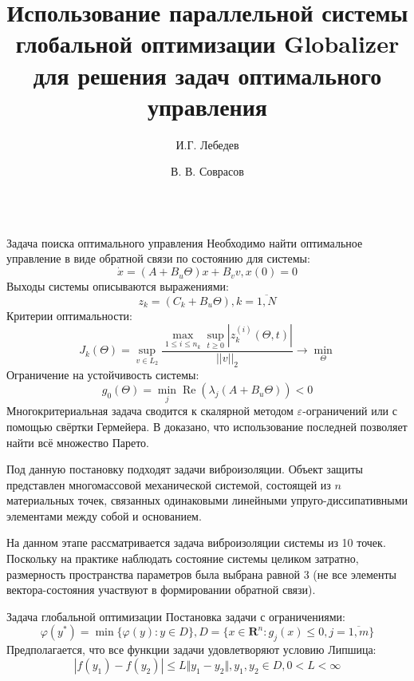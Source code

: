 \documentclass{beamer}
\title{Использование параллельной системы глобальной оптимизации Globalizer для
решения задач оптимального управления}
\author{И.Г. Лебедев \and В. В. Соврасов}
\institute{ННГУ им. Н.И. Лобачевского}
\DeclareMathOperator{\re}{\operatorname{Re}}
\begin{document}
\begin{frame}[t]
    \begin{columns}[t]
        \begin{column}[t]{0.48\paperwidth}
            \begin{block}{Задача поиска оптимального управления}
              Необходимо найти оптимальное управление в виде обратной связи по состоянию для системы:
              \begin{displaymath}
                \dot x = (A+B_u\Theta)x + B_v v, x(0)=0
              \end{displaymath}
              Выходы системы описываются выражениями:
              \begin{displaymath}
                z_k=(C_k+B_u\Theta),k=\overline{1,N}
              \end{displaymath}
              Критерии оптимальности:
              \begin{displaymath}
                J_k(\Theta)=\sup_{v\in L_2} \frac{\max_{1\leqslant i \leqslant n_k} \sup_{t\geqslant 0}|z_k^{(i)}(\Theta,t)|}{||v||_2} \rightarrow\min_{\Theta}
              \end{displaymath}
            Ограничение на устойчивость системы:
            \begin{displaymath}
              g_0(\Theta)=\min_{j}\re(\lambda_j(A+B_u\Theta)) < 0
            \end{displaymath}
            Многокритериальная задача сводится к скалярной методом \(\varepsilon\)-ограничений или с помощью свёртки Гермейера.
            В \cite{optControl} доказано, что использование последней позволяет найти всё множество Парето.

            Под данную постановку подходят задачи виброизоляции. Объект защиты представлен многомассовой механической системой, состоящей из
            \(n\) материальных точек, связанных одинаковыми линейными упруго-диссипативными элементами между собой и основанием.

            На данном этапе рассматривается задача виброизоляции системы из 10 точек. Поскольку на практике наблюдать состояние системы целиком
            затратно, размерность пространства параметров была выбрана равной 3 (не все элементы вектора-состояния участвуют в формировании обратной связи).
          \end{block}
            \begin{block}{Задача глобальной оптимизации}
              Постановка задачи с ограничениями:
              \begin{displaymath}
                \varphi(y^*)=\min\{\varphi(y):y\in D\}, D=\{x\in \mathbf{R}^n: g_j(x) \leqslant 0, j=\overline{1,m}\}
              \end{displaymath}
              Предполагается, что все функции задачи удовлетворяют условию Липшица:
              \begin{displaymath}
              |f(y_1)-f(y_2)|\leqslant L\Vert y_1-y_2\Vert,y_1,y_2\in D,0<L<\infty
              \end{displaymath}


\end{block}
\end{column}
\end{columns}
\end{frame}
\end{document}
